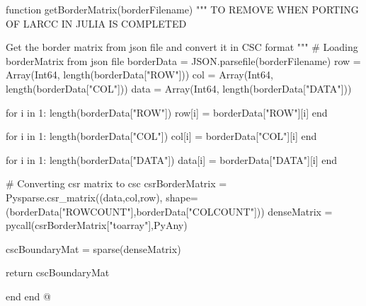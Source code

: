 \documentclass[11pt,oneside]{article}	%
\begin{document}
{function getBorderMatrix(borderFilename)
  """
  TO REMOVE WHEN PORTING OF LARCC IN JULIA IS COMPLETED

  Get the border matrix from json file and convert it in
  CSC format
  """
  # Loading borderMatrix from json file
  borderData = JSON.parsefile(borderFilename)
  row = Array(Int64, length(borderData["ROW"]))
  col = Array(Int64, length(borderData["COL"]))
  data = Array(Int64, length(borderData["DATA"]))

  for i in 1: length(borderData["ROW"])
    row[i] = borderData["ROW"][i]
  end

  for i in 1: length(borderData["COL"])
    col[i] = borderData["COL"][i]
  end

  for i in 1: length(borderData["DATA"])
    data[i] = borderData["DATA"][i]
  end

  # Converting csr matrix to csc
  csrBorderMatrix = Pysparse.csr_matrix((data,col,row), shape=(borderData["ROWCOUNT"],borderData["COLCOUNT"]))
  denseMatrix = pycall(csrBorderMatrix["toarray"],PyAny)

  cscBoundaryMat = sparse(denseMatrix)

  return cscBoundaryMat

end
end
@}
\end{document}
